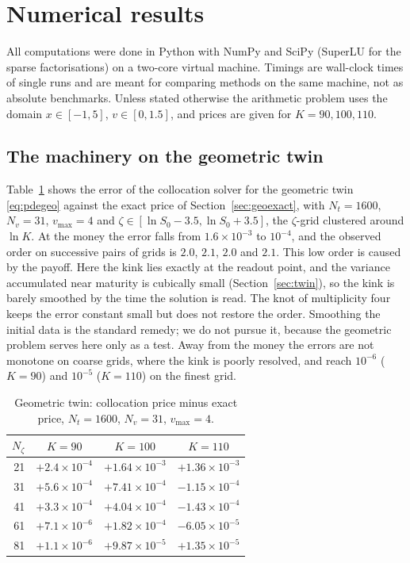 \section{Numerical results}\label{sec:results}

All computations were done in Python with NumPy and SciPy (SuperLU for the sparse factorisations) on a
two-core virtual machine. Timings are wall-clock times of single runs and are meant for comparing methods
on the same machine, not as absolute benchmarks. Unless stated otherwise the arithmetic problem uses the
domain $x\in[-1,5]$, $v\in[0,1.5]$, and prices are given for $K=90,100,110$.

\subsection{The machinery on the geometric twin}\label{sec:geo}

Table~\ref{tab:geo} shows the error of the collocation solver for the geometric twin \eqref{eq:pdegeo}
against the exact price of Section~\ref{sec:geoexact}, with $N_t=1600$, $N_v=31$, $v_{\max}=4$ and
$\zeta\in[\ln S_0-3.5,\ln S_0+3.5]$, the $\zeta$-grid clustered around $\ln K$. At the money the error
falls from $1.6\times10^{-3}$ to $10^{-4}$, and the observed order on successive pairs of grids is $2.0$,
$2.1$, $2.0$ and $2.1$. This low order is caused by the payoff. Here the kink lies exactly at the readout
point, and the variance accumulated near maturity is cubically small (Section~\ref{sec:twin}), so the
kink is barely smoothed by the time the solution is read. The knot of multiplicity four keeps the error
constant small but does not restore the order. Smoothing the initial data
\citep{KreissThomeeWidlund1970,PooleyVetzalForsyth2003} is the standard remedy; we do not pursue it,
because the geometric problem serves here only as a test. Away from the money the errors are not
monotone on coarse grids, where the kink is poorly resolved, and reach $10^{-6}$ ($K=90$) and
$10^{-5}$ ($K=110$) on the finest grid.

\begin{table}[t]
\centering
\caption{Geometric twin: collocation price minus exact price, $N_t=1600$, $N_v=31$, $v_{\max}=4$.}
\label{tab:geo}
\small
\begin{tabular}{rccc}
\toprule
$N_\zeta$ & $K=90$ & $K=100$ & $K=110$\\
\midrule
21 & $+2.4\times10^{-4}$ & $+1.64\times10^{-3}$ & $+1.36\times10^{-3}$\\
31 & $+5.6\times10^{-4}$ & $+7.41\times10^{-4}$ & $-1.15\times10^{-4}$\\
41 & $+3.3\times10^{-4}$ & $+4.04\times10^{-4}$ & $-1.43\times10^{-4}$\\
61 & $+7.1\times10^{-6}$ & $+1.82\times10^{-4}$ & $-6.05\times10^{-5}$\\
81 & $+1.1\times10^{-6}$ & $+9.87\times10^{-5}$ & $+1.35\times10^{-5}$\\
\bottomrule
\end{tabular}
\end{table}

